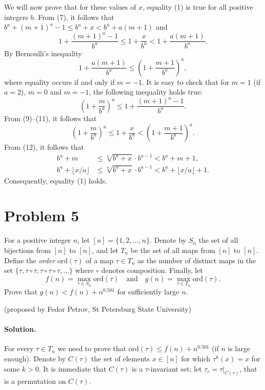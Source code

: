 \documentclass{article}
\begin{document}
We will now prove that for these values of $x$, equality (1) is true for all positive integers $b$.
From (7), it follows that $b^a + (m+1)^a - 1 \leq b^a + x < b^a + a(m+1)$ and
\begin{equation}
1 + \frac{(m+1)^a - 1}{b^a} \leq 1 + \frac{x}{b^a} < 1 + \frac{a(m+1)}{b^a}. \tag{9}
\end{equation}
By Bernoulli's inequality
\begin{equation}
1 + \frac{a(m+1)}{b^a} \leq \left(1 + \frac{m+1}{b^a}\right)^a, \tag{10}
\end{equation}
where equality occurs if and only if $m = -1$. It is easy to check that for $m = 1$ (if $a = 2$), $m = 0$ and $m = -1$, the following inequality holds true:
\begin{equation}
\left(1 + \frac{m}{b^a}\right)^a \leq 1 + \frac{(m+1)^a - 1}{b^a}. \tag{11}
\end{equation}
From (9)--(11), it follows that
\begin{equation}
\left(1 + \frac{m}{b^a}\right)^a \leq 1 + \frac{x}{b^a} < \left(1 + \frac{m+1}{b^a}\right)^a. \tag{12}
\end{equation}
From (12), it follows that
\begin{align*}
b^a + m &\leq \sqrt[a]{b^a + x} \cdot b^{a-1} < b^a + m + 1,\\
b^a + \lfloor x/a \rfloor &\leq \sqrt[a]{b^a + x} \cdot b^{a-1} < b^a + \lfloor x/a \rfloor + 1.
\end{align*}
Consequently, equality (1) holds.

\section*{Problem 5}
For a positive integer $n$, let $[n] = \{1, 2, \ldots, n\}$. Denote by $S_n$ the set of all bijections from $[n]$ to $[n]$, and let $T_n$ be the set of all maps from $[n]$ to $[n]$. Define the \emph{order} $\mathrm{ord}(\tau)$ of a map $\tau \in T_n$ as the number of distinct maps in the set $\{\tau, \tau \circ \tau, \tau \circ \tau \circ \tau, \ldots\}$ where $\circ$ denotes composition. Finally, let
\[
f(n) = \max_{\tau \in S_n} \mathrm{ord}(\tau) \quad \text{and} \quad g(n) = \max_{\tau \in T_n} \mathrm{ord}(\tau).
\]
Prove that $g(n) < f(n) + n^{0.501}$ for sufficiently large $n$.

(proposed by Fedor Petrov, St Petersburg State University)

\paragraph{Solution.}
For every $\tau \in T_n$ we need to prove that $\mathrm{ord}(\tau) \leq f(n) + n^{0.501}$ (if $n$ is large enough). Denote by $C(\tau)$ the set of elements $x \in [n]$ for which $\tau^k(x) = x$ for some $k > 0$. It is immediate that $C(\tau)$ is a $\tau$-invariant set; let $\tau_c = \tau|_{C(\tau)}$, that is a permutation on $C(\tau)$.
\end{document}
